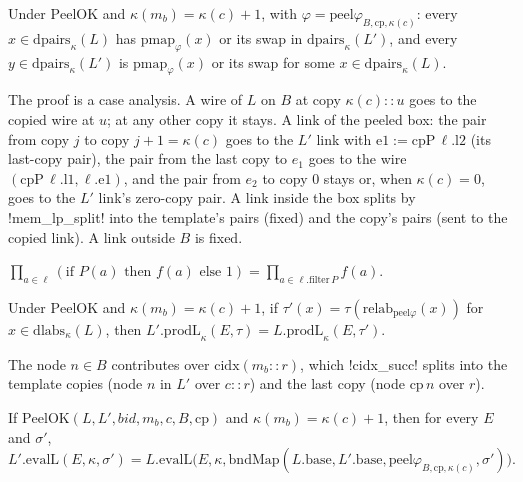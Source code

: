 \begin{theorem}\label{thm:lean-sym-peel-pairs}
Under $\mathrm{PeelOK}$ and $\kappa(m_b)=\kappa(c)+1$, with $\varphi=\mathrm{peel}\varphi_{B,\mathrm{cp},\kappa(c)}$: every $x\in\mathrm{dpairs}_\kappa(L)$ has $\mathrm{pmap}_\varphi(x)$ or its swap in $\mathrm{dpairs}_\kappa(L')$, and every $y\in\mathrm{dpairs}_\kappa(L')$ is $\mathrm{pmap}_\varphi(x)$ or its swap for some $x\in\mathrm{dpairs}_\kappa(L)$.
\end{theorem}

The proof is a case analysis. A wire of $L$ on $B$ at copy $\kappa(c)\mathbin{::}u$ goes to the copied wire at $u$; at any other copy it stays. A link of the peeled box: the pair from copy $j$ to copy $j+1=\kappa(c)$ goes to the $L'$ link with $\mathrm{e1}:=\mathrm{cpP}\,\ell.\mathrm{l2}$ (its last-copy pair), the pair from the last copy to $e_1$ goes to the wire $(\mathrm{cpP}\,\ell.\mathrm{l1},\ell.\mathrm{e1})$, and the pair from $e_2$ to copy $0$ stays or, when $\kappa(c)=0$, goes to the $L'$ link's zero-copy pair. A link inside the box splits by \lean!mem_lp_split! into the template's pairs (fixed) and the copy's pairs (sent to the copied link). A link outside $B$ is fixed.

\begin{proposition}
$\prod_{a\in\ell}(\text{if }P(a)\text{ then }f(a)\text{ else }1)=\prod_{a\in\ell.\mathrm{filter}\,P}f(a)$.
\end{proposition}

\begin{theorem}
Under $\mathrm{PeelOK}$ and $\kappa(m_b)=\kappa(c)+1$, if $\tau'(x)=\tau(\mathrm{relab}_{\mathrm{peel}\varphi}(x))$ for $x\in\mathrm{dlabs}_\kappa(L)$, then $L'.\mathrm{prodL}_\kappa(E,\tau)=L.\mathrm{prodL}_\kappa(E,\tau')$.
\end{theorem}

The node $n\in B$ contributes over $\mathrm{cidx}(m_b\mathbin{::}r)$, which \lean!cidx_succ! splits into the template copies (node $n$ in $L'$ over $c\mathbin{::}r$) and the last copy (node $\mathrm{cp}\,n$ over $r$).

\begin{theorem}\label{thm:lean-sym-peel}
If $\mathrm{PeelOK}(L,L',\mathit{bid},m_b,c,B,\mathrm{cp})$ and $\kappa(m_b)=\kappa(c)+1$, then for every $E$ and $\sigma'$,
\[
L'.\mathrm{evalL}(E,\kappa,\sigma')=L.\mathrm{evalL}\bigl(E,\kappa,\mathrm{bndMap}(L.\mathrm{base},L'.\mathrm{base},\mathrm{peel}\varphi_{B,\mathrm{cp},\kappa(c)},\sigma')\bigr).
\]
\end{theorem}

